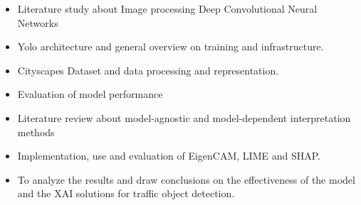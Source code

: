 \begin{itemize}
    \item Literature study about Image processing Deep Convolutional Neural Networks
    \item Yolo architecture and general overview on training and infrastructure.
    \item Cityscapes Dataset and data processing and representation.
    \item Evaluation of model performance
    \item Literature review about model-agnostic and model-dependent interpretation methods
    \item Implementation, use and evaluation of EigenCAM, LIME and SHAP\@.
    \item To analyze the results and draw conclusions on the effectiveness of the model and the XAI solutions for traffic object detection.
\end{itemize}

